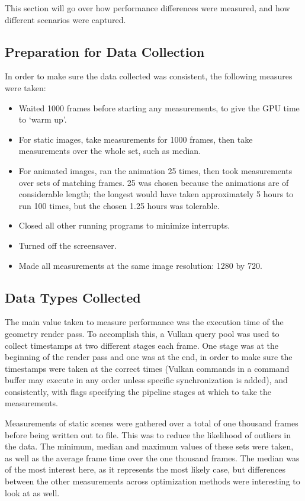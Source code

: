This section will go over how performance differences were measured, and how different scenarios were captured.

\subsection{Preparation for Data Collection}

In order to make sure the data collected was consistent, the following measures were taken:

\begin{itemize}
	\item Waited 1000 frames before starting any measurements, to give the GPU time to `warm up'.
	\item For static images, take measurements for 1000 frames, then take measurements over the whole set, such as median.
	\item For animated images, ran the animation 25 times, then took measurements over sets of matching frames. 25 was chosen because the animations are of considerable length; the longest would have taken approximately 5 hours to run 100 times, but the chosen 1.25 hours was tolerable.
	\item Closed all other running programs to minimize interrupts.
	\item Turned off the screensaver.
	\item Made all measurements at the same image resolution: 1280 by 720.
\end{itemize}

\subsection{Data Types Collected}

The main value taken to measure performance was the execution time of the geometry render pass. To accomplish this, a Vulkan query pool was used to collect timestamps at two different stages each frame. One stage was at the beginning of the render pass and one was at the end, in order to make sure the timestamps were taken at the correct times (Vulkan commands in a command buffer may execute in any order unless specific synchronization is added), and consistently, with flags specifying the pipeline stages at which to take the measurements.\newline

Measurements of static scenes were gathered over a total of one thousand frames before being written out to file. This was to reduce the likelihood of outliers in the data. The minimum, median and maximum values of these sets were taken, as well as the average frame time over the one thousand frames. The median was of the most interest here, as it represents the most likely case, but differences between the other measurements across optimization methods were interesting to look at as well.\newline

